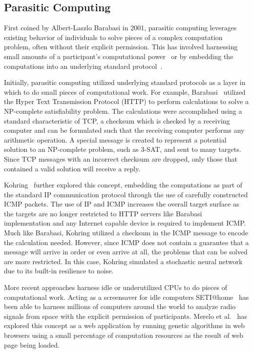 \documentclass[10pt,twocolumn]{article}
\begin{document}
\subsection{Parasitic Computing~\cite{Barabasi2001}}
\label{sec:parasitic-computing}
First coined by Albert-Laszlo Barabasi in 2001, parasitic computing 
leverages existing behavior of individuals to solve pieces of a complex 
computation problem, often without their explicit permission. This 
has involved harnessing small amounts of a participant's computational 
power~\cite{Anderson2002,Merelo2007,Merelo-Guervos2008} or by 
embedding the computations into an underlying standard 
protocol~\cite{Barabasi2001,Kohring2003}.

Initially, parasitic computing utilized underlying standard protocols
as a layer in which to do small pieces of computational work. For 
example, Barabasi~\cite{Barabasi2001} utilized the Hyper Text 
Transmission Protocol (HTTP) to perform calculations to solve
a NP-complete satisfiability problem. The calculations were 
accomplished using a standard characteristic of TCP, a checksum which
is checked by a receiving computer and can be formulated such that
the receiving computer performs any arithmetic operation. A special
message is created to represent a potential solution to an NP-complete
problem, such as 3-SAT, and sent to many targets. Since TCP messages
with an incorrect checksum are dropped, only those that contained 
a valid solution will receive a reply. 

Kohring~\cite{Kohring2003} further explored this concept, embedding the 
computations as part of the standard IP communication protocol through 
the use of carefully constructed ICMP packets. The use of IP and ICMP
increases the overall target surface as the targets are no longer
restricted to HTTP servers like Barabasi implementation and any
Internet capable device is required to implement ICMP. Much like 
Barabasi, Kohring utilized a checksum in the ICMP message to encode
the calculation needed. However, since ICMP does not contain a guarantee
that a message will arrive in order or even arrive at all, the
problems that can be solved are more restricted. In this case, 
Kohring simulated a stochastic neural network due to its built-in 
resilience to noise.

More recent approaches harness idle or underutilized CPUs to do
pieces of computational work. Acting as a screensaver for idle 
computers SETI@home~\cite{Anderson2002} has been able to harness 
millions of computers around the world to analyze radio signals 
from space with the explicit permission of participants. Merelo 
et al.~\cite{Merelo2007,Merelo-Guervos2008} has explored this 
concept as a web application by running genetic algorithms in web 
browsers using a small percentage of computation resources as the 
result of web page being loaded.
\end{document}
